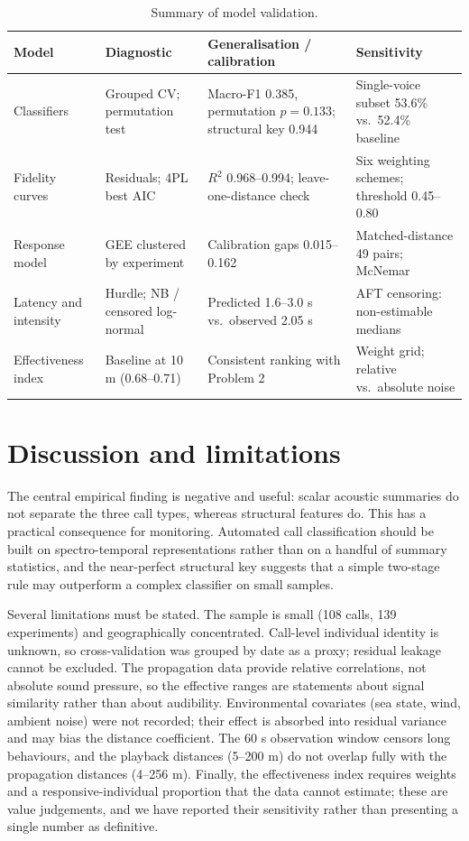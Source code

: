 \documentclass{apmcmthesis}
\begin{document}
\begin{table}[htbp]
\centering
\caption{Summary of model validation.}
\label{tab:validation}
\small
\begin{tabularx}{\textwidth}{@{}l>{\raggedright\arraybackslash}X>{\raggedright\arraybackslash}X>{\raggedright\arraybackslash}X@{}}
\toprule
Model & Diagnostic & Generalisation / calibration & Sensitivity \\
\midrule
Classifiers & Grouped CV; permutation test & Macro-F1 0.385, permutation $p=0.133$; structural key 0.944 & Single-voice subset 53.6\% vs.\ 52.4\% baseline \\
Fidelity curves & Residuals; 4PL best AIC & $R^2$ 0.968--0.994; leave-one-distance check & Six weighting schemes; threshold 0.45--0.80 \\
Response model & GEE clustered by experiment & Calibration gaps 0.015--0.162 & Matched-distance 49 pairs; McNemar \\
Latency and intensity & Hurdle; NB / censored log-normal & Predicted 1.6--3.0 s vs.\ observed 2.05 s & AFT censoring: non-estimable medians \\
Effectiveness index & Baseline at 10 m (0.68--0.71) & Consistent ranking with Problem 2 & Weight grid; relative vs.\ absolute noise \\
\bottomrule
\end{tabularx}
\end{table}

\section{Discussion and limitations}

The central empirical finding is negative and useful: scalar acoustic summaries do not separate
the three call types, whereas structural features do. This has a practical consequence for
monitoring. Automated call classification should be built on spectro-temporal representations
rather than on a handful of summary statistics, and the near-perfect structural key suggests
that a simple two-stage rule may outperform a complex classifier on small samples.

Several limitations must be stated. The sample is small (108 calls, 139 experiments) and
geographically concentrated. Call-level individual identity is unknown, so cross-validation was
grouped by date as a proxy; residual leakage cannot be excluded. The propagation data provide
relative correlations, not absolute sound pressure, so the effective ranges are statements about
signal similarity rather than about audibility. Environmental covariates (sea state, wind,
ambient noise) were not recorded; their effect is absorbed into residual variance and may bias
the distance coefficient. The 60 s observation window censors long behaviours, and the playback
distances (5--200 m) do not overlap fully with the propagation distances (4--256 m). Finally,
the effectiveness index requires weights and a responsive-individual proportion that the data
cannot estimate; these are value judgements, and we have reported their sensitivity rather than
presenting a single number as definitive.
\end{document}
